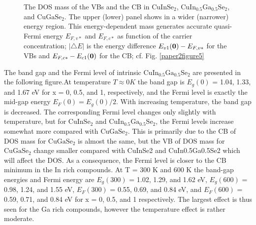 \documentclass[a4paper, 12pt, titlepage,oneside,drop]{kthesis}
\begin{document}
\begin{figure}[H]
\begin{center}
\end{center}
\caption{The DOS mass of the VBs and the CB in $\mathrm {CuInSe_2}$, $\mathrm {CuIn_{0.5}Ga_{0.5}Se_2}$, and $\mathrm {CuGaSe_2}$. The upper (lower) panel shows  in a wider (narrower) energy region. 
This energy-dependent mass generates accurate quasi-Fermi energy $E_{F,v*}$ and $E_{F,c*}$ as function of the carrier concentration; $|\bigtriangleup E|$ is the energy difference 
 $E_{v1}(\textbf 0) - E_{F,v*}$ for the VBs and $E_{F,c*} - E_{c1}(\textbf 0)$ for the CB; cf.  Fig. \ref{paper2figure5}  }
\label{paper2figure6}
\end{figure}





The band gap and the Fermi level of intrinsic $\mathrm {CuIn_{0.5}Ga_{0.5}Se_2}$ are presented in the following figure.At temperature $T \approx 0 K$ the band gap is
$E_g(0)$ = 1.04, 1.33, and 1.67 eV for x = 0, 0.5, and 1, respectively, and the Fermi level is exactly the mid-gap energy $E_F(0) = E_g(0)/2$. With increasing temperature,
the band gap is decreased. The corresponding Fermi level changes only slightly with temperature, but for $\mathrm {CuInSe_2}$ and $\mathrm {CuIn_{0.5}Ga_{0.5}Se_2}$, the Fermi levels increase
somewhat more compared with $\mathrm {CuGaSe_2}$. This is primarily due to the CB of DOS mass for $\mathrm {CuGaSe_2}$ is almost the same, but the VB of DOS mass for $\mathrm {CuGaSe_2}$ change smaller
compared with CuInSe2 and CuIn0.5Ga0.5Se2 which will affect the DOS. As a consequence, the Fermi level is closer to the CB minimum in the In rich compounds. 
At T = 300 K and 600 K the band-gap energies and Fermi energy are $E_g(300)$ = 1.02, 1.29, and 1.62 eV, $E_g(600)$ = 0.98, 1.24, and 1.55 eV, $E_F(300)$ = 0.55, 0.69,
and 0.84 eV, and $E_F(600)$ = 0.59, 0.71, and 0.84 eV for x = 0, 0.5, and 1 respectively. The largest effect is thus seen for the Ga rich compounds,
however the temperature effect is rather moderate.
\end{document}
